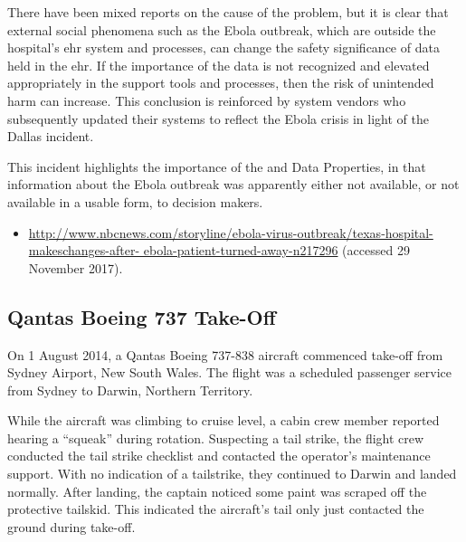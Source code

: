 There have been mixed reports on the cause of the problem, but it is clear that external social phenomena such as the Ebola outbreak, which are outside the hospital's \gls{ehr} system and processes, can change the safety significance of data held in the \gls{ehr}. If the importance of the data is not recognized and elevated appropriately in the support tools and processes, then the risk of unintended harm can increase. This conclusion is reinforced by system vendors who subsequently updated their systems to reflect the Ebola crisis in light of the Dallas incident.

This incident highlights the importance of the  and  Data Properties, in that \gls{information} about the Ebola outbreak was apparently either not available, or not available in a usable form, to decision makers.

\begin{samepage}
\begin{itemize}
  \item \raggedright{\href{http://www.nbcnews.com/storyline/ebola-virus-outbreak/texas-hospital-makeschanges-after-ebola-patient-turned-away-n217296}{http://www.nbcnews.com/storyline/ebola-virus-outbreak/texas-hospital-makeschanges-after- ebola-patient-turned-away-n217296} (accessed 29 November 2017).} 
\end{itemize}
\end{samepage}


\subsection{Qantas Boeing 737 Take-Off} \label{bkm:incacc:qantastakeoff}
On 1 August 2014, a Qantas Boeing 737-838 aircraft commenced take-off from Sydney Airport, New South Wales. The flight was a scheduled passenger service from Sydney to Darwin, Northern Territory.

While the aircraft was climbing to cruise level, a cabin crew member reported hearing a ``squeak'' during rotation. Suspecting a tail strike, the flight crew conducted the tail strike checklist and contacted the operator's maintenance support. With no indication of a tailstrike, they continued to Darwin and landed normally. After landing, the captain noticed some paint was scraped off the protective tailskid. This indicated the aircraft's tail only just contacted the ground during take-off.

